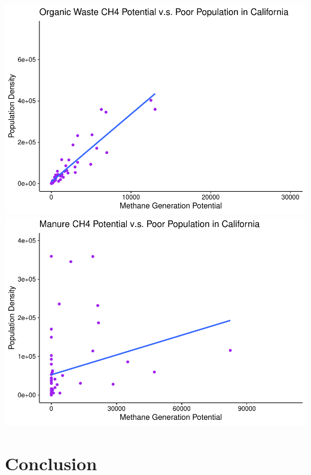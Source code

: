 \documentclass[
  12pt,
]{article}
\begin{document}
\includegraphics{FDR_Final_files/figure-latex/unnamed-chunk-8-4.pdf}
\includegraphics{FDR_Final_files/figure-latex/unnamed-chunk-8-5.pdf}

\newpage

\hypertarget{conclusion}{%
\section{Conclusion}\label{conclusion}}
\end{document}
